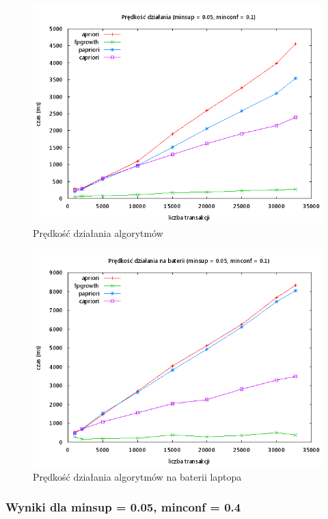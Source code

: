 \begin{figure}[ht]
\centering
\includegraphics[width=1.1\textwidth]{figures/06/005_01.png}
\caption{Prędkość działania algorytmów}
\end{figure}

\begin{figure}[ht]
\centering
\includegraphics[width=1.1\textwidth]{figures/06/005_01_bat.png}
\caption{Prędkość działania algorytmów na baterii laptopa}
\end{figure}

\subsubsection{Wyniki dla minsup = 0.05, minconf = 0.4}

